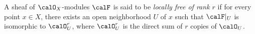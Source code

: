     

    \begin{definition}\label{def:locally_free_O_X_modules}
        A sheaf of \(\calO_X\)-modules \(\calF\) is said to be \emph{locally free of rank \(r\)} if for every point \(x \in X\), there exists an open neighborhood \(U\) of \(x\) such that \(\calF|_U\) is isomorphic to \(\calO_U^r\), 
        where \(\calO_U^r\) is the direct sum of \(r\) copies of \(\calO_U\).
    \end{definition}

        



